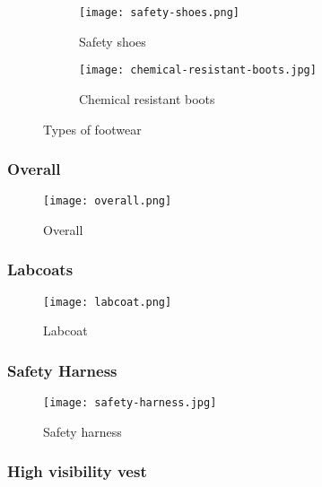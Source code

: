 \documentclass[a4paper,12pt]{article}
\begin{document}
						\begin{figure}[H]
						\centering
							\begin{subfigure}{0.5\textwidth}
							\centering				
								\texttt{[image: safety-shoes.png]}
							\caption{Safety shoes}
							\label{subfig:safety-shoes}
							\end{subfigure}
							\hfill
							\begin{subfigure}{0.5\textwidth}
							\centering				
								\texttt{[image: chemical-resistant-boots.jpg]}
							\caption{Chemical resistant boots}
							\label{subfig:chemical-resistant-boots}
							\end{subfigure}
							\caption{Types of footwear}
							\label{fig:footwear}
						\end{figure}
						
					\subsubsection*{Overall}
					
						\begin{figure}[H]
							\centering				
								\texttt{[image: overall.png]}
							\caption{Overall}
							\label{fig:overall}
						\end{figure}
						
					\subsubsection*{Labcoats}
					
						\begin{figure}[H]
							\centering				
								\texttt{[image: labcoat.png]}
							\caption{Labcoat}
							\label{fig:labcoat}
						\end{figure}
						
					\subsubsection*{Safety Harness}
						
						\begin{figure}[H]
							\centering				
								\texttt{[image: safety-harness.jpg]}
							\caption{Safety harness}
							\label{fig:safety-harness}
						\end{figure}						
										
					\subsubsection*{High visibility vest}
					
\end{document}
